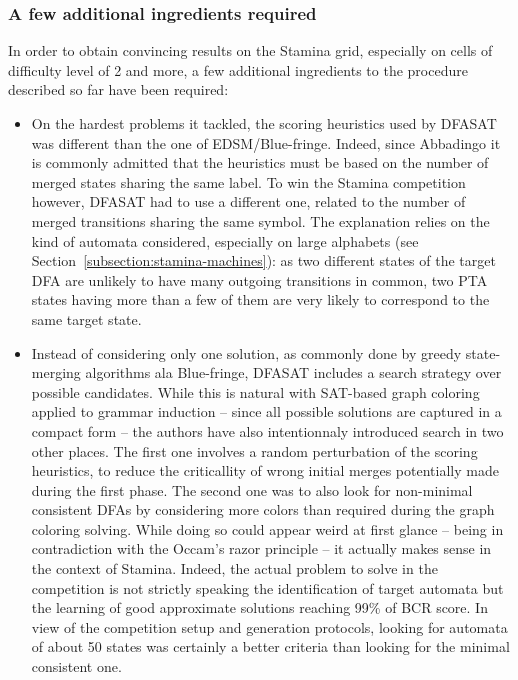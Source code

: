 \subsubsection*{A few additional ingredients required}

In order to obtain convincing results on the Stamina grid, especially on cells of difficulty level of 2 and more, a few additional ingredients to the procedure described so far have been required:

\begin{itemize}

\item On the hardest problems it tackled, the scoring heuristics used by DFASAT was different than the one of EDSM/Blue-fringe. Indeed, since Abbadingo it is commonly admitted that the heuristics must be based on the number of merged states sharing the same label. To win the Stamina competition however, DFASAT had to use a different one, related to the number of merged transitions sharing the same symbol. The explanation relies on the kind of automata considered, especially on large alphabets (see Section~\ref{subsection:stamina-machines}): as two different states of the target DFA are unlikely to have many outgoing transitions in common, two PTA states having more than a few of them are very likely to correspond to the same target state.

\item Instead of considering only one solution, as commonly done by greedy state-merging algorithms ala Blue-fringe, DFASAT includes a search strategy over possible candidates. While this is natural with SAT-based graph coloring applied to grammar induction -- since all possible solutions are captured in a compact form -- the authors have also intentionnaly introduced search in two other places. The first one involves a random perturbation of the scoring heuristics, to reduce the criticallity of wrong initial merges potentially made during the first phase. The second one was to also look for non-minimal consistent DFAs by considering more colors than required during the graph coloring solving. While doing so could appear weird at first glance -- being in contradiction with the Occam's razor principle -- it actually makes sense in the context of Stamina. Indeed, the actual problem to solve in the competition is not strictly speaking the identification of target automata but the learning of good approximate solutions reaching 99\% of BCR score. In view of the competition setup and generation protocols, looking for automata of about 50 states was certainly a better criteria than looking for the minimal consistent one.

\end{itemize}


